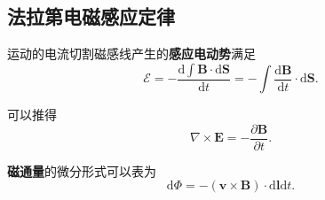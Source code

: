 \subsection{法拉第电磁感应定律}
运动的电流切割磁感线产生的\textbf{感应电动势}满足
\begin{equation}
    \mathcal{E}=-\frac{\mathrm{d}\int\bm{B}\cdot\mathrm{d}\bm{S}}{\mathrm{d}t}=-\int\frac{\mathrm{d}\bm{B}}{\mathrm{d}t}\cdot\mathrm{d}\bm{S}.
\end{equation}

可以推得
\begin{equation}
    \nabla\times\bm{E}=-\frac{\partial\bm{B}}{\partial t}.
\end{equation}

\textbf{磁通量}的微分形式可以表为
\begin{equation}
    \mathrm{d}\Phi=-(\bm{v}\times\bm{B})\cdot\mathrm{d}\bm{l}\mathrm{d}t.
\end{equation}
